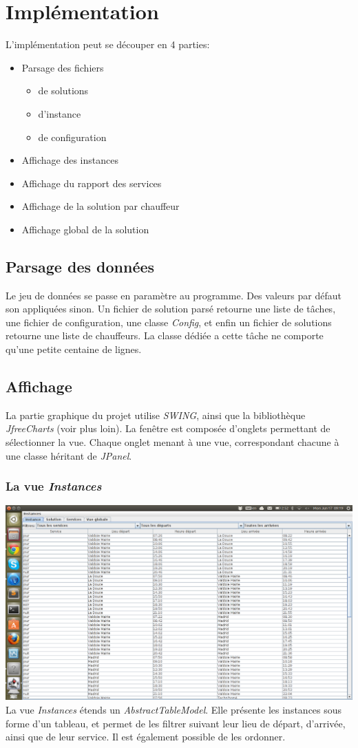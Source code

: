 \documentclass[12pt]{article}
\begin{document}
\newpage
\section{Implémentation}
L'implémentation peut se découper en 4 parties:
\begin{itemize}
	\item Parsage des fichiers
	\begin{itemize}
	    \item de solutions
	    \item d'instance
	    \item de configuration
    \end{itemize}
    \item Affichage des instances
    \item Affichage du rapport des services
    \item Affichage de la solution par chauffeur
    \item Affichage global de la solution
\end{itemize}

\subsection{Parsage des données}
Le jeu de données se passe en paramètre au programme. Des valeurs par défaut son appliquées sinon. Un fichier de solution parsé retourne une liste de tâches, une fichier de configuration, une classe \emph{Config}, et enfin un fichier de solutions retourne une liste de chauffeurs. La classe dédiée a cette tâche ne comporte qu'une petite centaine de lignes.
\subsection{Affichage}
La partie graphique du projet utilise \emph{SWING}, ainsi que la bibliothèque \emph{JfreeCharts} (voir plus loin). La fenêtre est composée d'onglets permettant de sélectionner la vue. Chaque onglet menant à une vue, correspondant chacune à une classe héritant de \emph{JPanel}. 
\subsubsection{La vue \emph{Instances}}
\includegraphics[width=\textwidth]{instances.png}
La vue \emph{Instances} étends un \emph{AbstractTableModel}. Elle présente les instances sous forme d'un tableau, et permet de les filtrer suivant leur lieu de départ, d'arrivée, ainsi que de leur service. Il est également possible de les ordonner.
\end{document}

